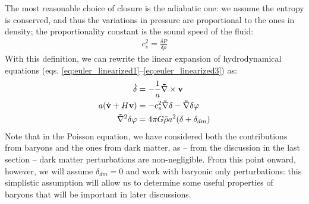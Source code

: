  The most reasonable choice of closure is the adiabatic one: we assume the entropy is conserved, and thus the variations in pressure are proportional to the ones in density; the proportionality constant is the sound speed of the fluid:
 \begin{align}
   c_s^2 = \frac{\delta P}{\delta \rho} 
 \end{align}
 With this definition, we can rewrite the linear expansion of hydrodynamical equations (eqs. \ref{eq:euler_linearized1}--\ref{eq:euler_linearized3}) as:
 \begin{align}
    \Dot{\delta} &= - \frac{1}{a}\mathbf{\nabla}\times \mathbf{v}\\
    a(\Dot{\mathbf{v}}+H\mathbf{v}) &= -c_s^2\mathbf{\nabla}\delta  - \mathbf{\nabla}\delta\varphi\\
    \mathbf{\nabla}^2\delta\varphi &= 4\pi G\Bar{\rho}a^2(\delta+\delta_{dm}) 
 \end{align} 
 Note that in the Poisson equation, we have considered both the contributions from baryons and the ones from dark matter, as -- from the discussion in the last section -- dark matter perturbations are non-negligible. From this point onward, however, we will assume $\delta_{dm}=0$ and work with baryonic only perturbations: this simplistic assumption will allow us to determine some useful properties of baryons that will be important in later discussions.

